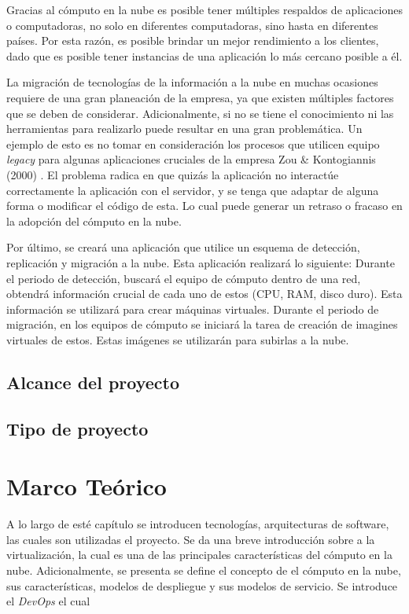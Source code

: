 \documentclass[12pt,twoside]{reedthesis}
\theoremstyle{definition}
\theoremstyle{definition}
\theoremstyle{definition}
\theoremstyle{remark}
\begin{document}
Gracias al cómputo en la nube es posible tener múltiples respaldos de
aplicaciones o computadoras, no solo en diferentes computadoras, sino
hasta en diferentes países. Por esta razón, es posible brindar un mejor
rendimiento a los clientes, dado que es posible tener instancias de una
aplicación lo más cercano posible a él.

La migración de tecnologías de la información a la nube en muchas
ocasiones requiere de una gran planeación de la empresa, ya que existen
múltiples factores que se deben de considerar. Adicionalmente, si no se
tiene el conocimiento ni las herramientas para realizarlo puede resultar
en una gran problemática. Un ejemplo de esto es no tomar en
consideración los procesos que utilicen equipo \emph{legacy} para
algunas aplicaciones cruciales de la empresa Zou \& Kontogiannis (2000)
. El problema radica en que quizás la aplicación no interactúe
correctamente la aplicación con el servidor, y se tenga que adaptar de
alguna forma o modificar el código de esta. Lo cual puede generar un
retraso o fracaso en la adopción del cómputo en la nube.

Por último, se creará una aplicación que utilice un esquema de
detección, replicación y migración a la nube. Esta aplicación realizará
lo siguiente: Durante el periodo de detección, buscará el equipo de
cómputo dentro de una red, obtendrá información crucial de cada uno de
estos (CPU, RAM, disco duro). Esta información se utilizará para crear
máquinas virtuales. Durante el periodo de migración, en los equipos de
cómputo se iniciará la tarea de creación de imagines virtuales de estos.
Estas imágenes se utilizarán para subirlas a la nube.

\hypertarget{alcance-del-proyecto}{%
\section{Alcance del proyecto}\label{alcance-del-proyecto}}

\hypertarget{tipo-de-proyecto}{%
\section{Tipo de proyecto}\label{tipo-de-proyecto}}

\hypertarget{ref_labels}{%
\chapter{Marco Teórico}\label{ref_labels}}

A lo largo de esté capítulo se introducen tecnologías, arquitecturas de
software, las cuales son utilizadas el proyecto. Se da una breve
introducción sobre a la virtualización, la cual es una de las
principales características del cómputo en la nube. Adicionalmente, se
presenta se define el concepto de el cómputo en la nube, sus
características, modelos de despliegue y sus modelos de servicio. Se
introduce el \emph{DevOps} el cual
\end{document}
